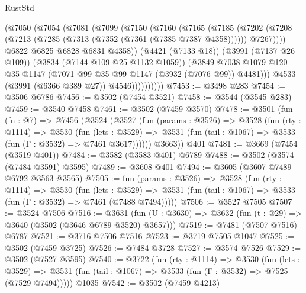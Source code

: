 \begin{lexlean}{RustStd}
\begin{coremodule}
                  (@7050
                    (@7054
                      (@7081
                        (@7099
                          (@7150
                            (@7160
                              (@7165
                                (@7185
                                  (@7202
                                    (@7208
                                      (@7213 (@7285 (@7313 (@7352 (@7361 (@7385 @7387 @4358))))))
                                      @7267))))
                              @6822
                              @6825
                              @6828
                              @6831
                              @4358))
                          (@4421 (@7133 @18))
                          (@3991 (@7137 @26 @109))
                          (@3834 (@7144 @109 @25 @1132 @1059))
                          (@3849
                            @7038
                            @1079
                            @120
                            @35
                            @1147
                            (@7071 @99 @35 @99 @1147 (@3932 (@7076 @99)) @4481)))
                        @4533
                        (@3991 (@6366 @389 @27))
                        @4546))))))))))
@7453 := @3498 @283
@7454 := @3506 @6786
@7456 := @3502 (@7454 @3521)
@7458 := @3544 (@3545 @283)
@7459 := @3540 @7458
@7461 := @3502 (@7459 @3570)
@7478 := @3501
    (fun (fn : @7) =>
    @7456
      (@3524
        (@3527
          (fun (params : @3526) =>
          @3528
            (fun (rty : @1114) =>
            @3530
              (fun (lets : @3529) =>
              @3531 (fun (tail : @1067) => @3533 (fun (Γ : @3532) => @7461 @3617))))))
        @3663))
    @401
@7481 := @3669 (@7454 (@3519 @401))
@7484 := @3582 (@3583 @401) @6789
@7488 := @3502 (@3574 (@7484 @3591) @3595)
@7489 := @3608 @401
@7494 := @3605 (@3607 @7489 @6792 @3563 @3565)
@7505 := fun (params : @3526) =>
  @3528
    (fun (rty : @1114) =>
    @3530
      (fun (lets : @3529) =>
      @3531 (fun (tail : @1067) => @3533 (fun (Γ : @3532) => @7461 (@7488 @7494)))))
@7506 := @3527 @7505
@7507 := @3524 @7506
@7516 := @3631 (fun (U : @3630) => @3632 (fun (t : @29) => @3640 (@3502 (@3646 @6789 @3520) @3657)))
@7519 := @7481 (@7507 @7516) @6787
@7521 := @3716 @7506 @7516
@7523 := @3719 @7505 @1047
@7525 := @3502 (@7459 @3725)
@7526 := @7484 @3728
@7527 := @3574 @7526
@7529 := @3502 (@7527 @3595)
@7540 := @3722
    (fun (rty : @1114) =>
    @3530
      (fun (lets : @3529) =>
      @3531 (fun (tail : @1067) => @3533 (fun (Γ : @3532) => @7525 (@7529 @7494)))))
    @1035
@7542 := @3502 (@7459 @4213)

\end{coremodule}
\end{lexlean}

